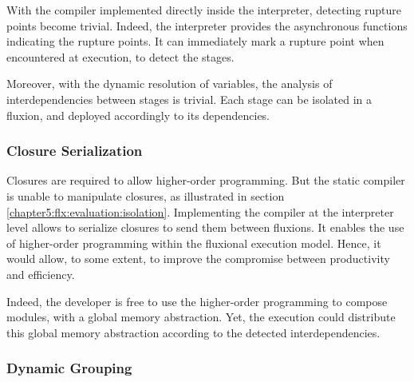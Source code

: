 With the compiler implemented directly inside the interpreter, detecting rupture points become trivial.
Indeed, the interpreter provides the asynchronous functions indicating the rupture points.
It can immediately mark a rupture point when encountered at execution, to detect the stages.

Moreover, with the dynamic resolution of variables, the analysis of interdependencies between stages is trivial.
Each stage can be isolated in a fluxion, and deployed accordingly to its dependencies.


\subsubsection{Closure Serialization}

Closures are required to allow higher-order programming.
But the static compiler is unable to manipulate closures, as illustrated in section \ref{chapter5:flx:evaluation:isolation}.
Implementing the compiler at the interpreter level allows to serialize closures to send them between fluxions.
It enables the use of higher-order programming within the fluxional execution model.
Hence, it would allow, to some extent, to improve the compromise between productivity and efficiency.

Indeed, the developer is free to use the higher-order programming to compose modules, with a global memory abstraction.
Yet, the execution could distribute this global memory abstraction according to the detected interdependencies.

\subsubsection{Dynamic Grouping}

